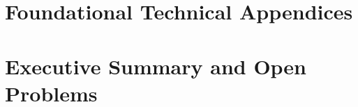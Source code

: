 \documentclass[11pt,a4paper]{report}
\begin{document}


\chapter{Foundational Technical Appendices}
\label{ch:diamond-standard}






\chapter{Executive Summary and Open Problems}
\label{ch:executive-summary}








\end{document}
